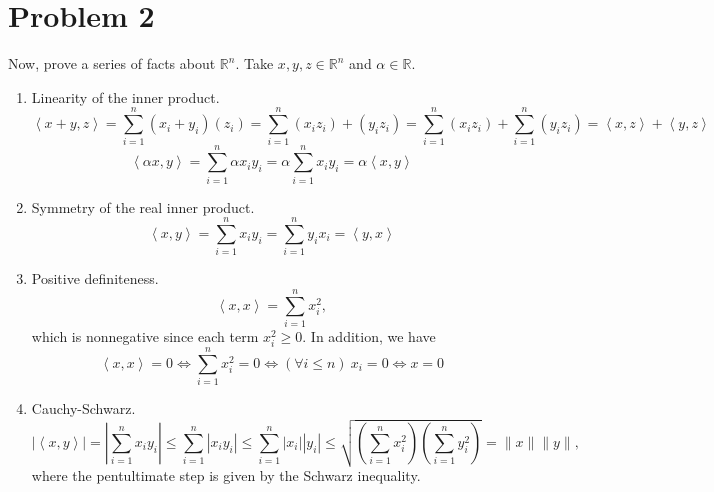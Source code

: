 \documentclass[11pt, oneside]{article}
\newcommand{\R}{\mathbb{R}}
\newcommand{\ip}[1]{\left \langle #1 \right \rangle}
\begin{document}
\section*{Problem 2}
Now, prove a series of facts about $\R^n$. Take $x, y, z \in \R^n$ and $\alpha \in \R$.
\begin{enumerate}
    \item Linearity of the inner product.
        $$\ip{x + y, z} = \sum_{i = 1}^n (x_i + y_i) (z_i) = \sum_{i = 1}^n (x_i z_i) + (y_i z_i) = \sum_{i = 1}^n (x_i z_i) + \sum_{i = 1}^n (y_i z_i) = \ip{x, z} + \ip{y, z}$$
        $$\ip{\alpha x, y} = \sum_{i=1}^n \alpha x_i y_i = \alpha \sum_{i=1}^n x_i y_i = \alpha \ip{x, y}$$
    \item Symmetry of the real inner product.
    $$\ip{x, y} = \sum_{i=1}^n x_i y_i = \sum_{i=1}^n y_i x_i = \ip{y, x}$$
    \item Positive definiteness.
    $$\ip{x, x} = \sum_{i=1}^n x_i^2,$$
    which is nonnegative since each term $x_i^2 \geq 0$. In addition, we have
    $$\ip{x, x} = 0 \iff \sum_{i=1}^n x_i^2 = 0 \iff (\forall i \leq n) \ x_i = 0  \iff x = 0$$
    \item Cauchy-Schwarz.
    $$|\ip{x, y}| = \left| \sum_{i=1}^n x_i y_i \right| \leq \sum_{i=1}^n |x_iy_i| \leq \sum_{i=1}^n |x_i||y_i| \leq \sqrt{\left( \sum_{i=1}^n x_i^2 \right) \left( \sum_{i=1}^n y_i^2 \right)} = \|x\| \|y\|,$$
    where the pentultimate step is given by the Schwarz inequality.
\end{enumerate}
\end{document}
